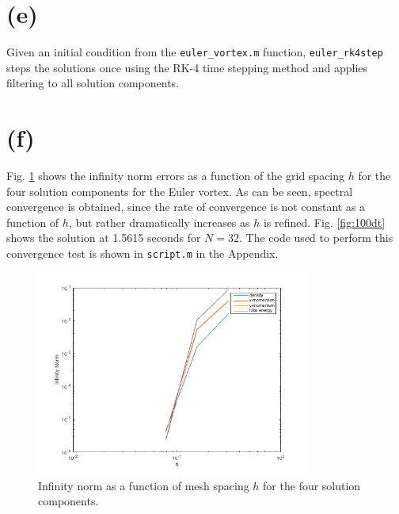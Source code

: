 \documentclass[10pt]{article}
\begin{document}
\section{(e)}
Given an initial condition from the {\tt euler\_vortex.m} function, {\tt euler\_rk4step} steps the solutions once using the RK-4 time stepping method and applies filtering to all solution components.

\section{(f)}
Fig. \ref{fig:convergence} shows the infinity norm errors as a function of the grid spacing \(h\) for the four solution components for the Euler vortex. As can be seen, spectral convergence is obtained, since the rate of convergence is not constant as a function of \(h\), but rather dramatically increases as \(h\) is refined. Fig. \ref{fig:100dt} shows the solution at 1.5615 seconds for \(N=32\). The code used to perform this convergence test is shown in {\tt script.m} in the Appendix.


\begin{figure}[H]
\centering
\includegraphics[width=0.8\textwidth]{figures/convergence.png}
\caption{Infinity norm as a function of mesh spacing \(h\) for the four solution components.}
\label{fig:convergence}
\end{figure}
\end{document}
